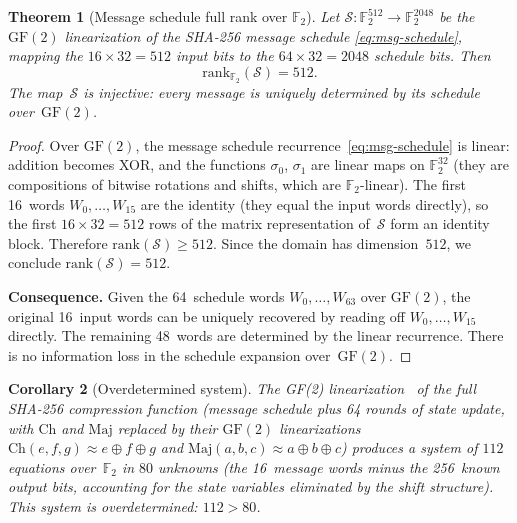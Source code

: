 \documentclass[12pt, a4paper]{article}
\theoremstyle{plain}
\newtheorem{theorem}{Theorem}[section]
\newtheorem{corollary}[theorem]{Corollary}
\theoremstyle{definition}
\newcommand{\F}{\mathbb{F}}
\newcommand{\GF}{\mathrm{GF}}
\newcommand{\rk}{\mathrm{rank}}
\newcommand{\Ch}{\mathrm{Ch}}
\newcommand{\Maj}{\mathrm{Maj}}
\begin{document}
\begin{theorem}[Message schedule full rank over $\F_{2}$]\label{thm:gf2-rank}
Let $\mathcal{S}\colon\F_{2}^{512}\to\F_{2}^{2048}$ be the
$\GF(2)$ linearization of the SHA-256 message schedule
\eqref{eq:msg-schedule}, mapping the $16\times 32=512$ input
bits to the $64\times 32=2048$ schedule bits.
Then
\begin{equation}
  \rk_{\F_{2}}(\mathcal{S}) = 512.
\end{equation}
The map~$\mathcal{S}$ is injective: every message is uniquely
determined by its schedule over~$\GF(2)$.
\end{theorem}

\begin{proof}
Over $\GF(2)$, the message schedule recurrence~\eqref{eq:msg-schedule}
is linear: addition becomes XOR, and the functions $\sigma_{0}$,
$\sigma_{1}$ are linear maps on $\F_{2}^{32}$ (they are
compositions of bitwise rotations and shifts, which are
$\F_{2}$-linear).
The first 16~words $W_{0},\ldots,W_{15}$ are the identity
(they equal the input words directly), so the first
$16\times 32=512$ rows of the matrix representation of~$\mathcal{S}$
form an identity block.
Therefore $\rk(\mathcal{S})\ge 512$.
Since the domain has dimension~$512$, we conclude
$\rk(\mathcal{S})=512$.

\medskip
\noindent\textbf{Consequence.}
Given the 64~schedule words $W_{0},\ldots,W_{63}$ over $\GF(2)$,
the original 16~input words can be uniquely recovered by
reading off $W_{0},\ldots,W_{15}$ directly.
The remaining 48~words are determined by the linear recurrence.
There is no information loss in the schedule expansion over~$\GF(2)$.
\end{proof}

\begin{corollary}[Overdetermined system]\label{cor:overdetermined}
The GF(2) linearization~\cite{sha-linear} of the full SHA-256 compression
function (message schedule plus 64 rounds of state update, with
$\Ch$ and $\Maj$ replaced by their $\GF(2)$ linearizations
$\Ch(e,f,g)\approx e\oplus f\oplus g$ and
$\Maj(a,b,c)\approx a\oplus b\oplus c$) produces a system of
$112$ equations over~$\F_{2}$ in $80$ unknowns
(the 16~message words minus the 256~known output bits, accounting
for the state variables eliminated by the shift structure).
This system is overdetermined: $112>80$.
\end{corollary}
\end{document}
